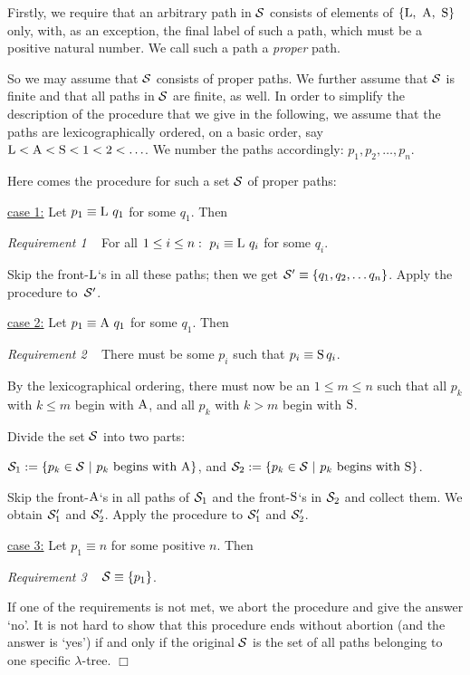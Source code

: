 \documentclass[submission,copyright,creativecommons]{eptcs}
\begin{document}
\begin{Proc}\label{ProLamTre}
Firstly, we require that an arbitrary path in ${\cal S}$ consists of elements of $\{ {\rm L}, ~ {\rm A}, ~ {\rm S} \}$ only, with, as an exception, the final label of such a path, which must be a positive natural number. We call such a path a {\em proper\/} path.

So we may assume that ${\cal S}$ consists of proper paths. We further assume that ${\cal S}$ is finite and that all paths in ${\cal S}$ are finite, as well. In order to simplify the description of the procedure that we give in the following, we assume that the paths are lexicographically ordered, on a basic order, say ${\rm L} < {\rm A} < {\rm S} < 1 < 2 < \ldots$. We number the paths accordingly: $p_1, p_2, \ldots, p_n$.

Here comes the procedure for such a set ${\cal S}$ of proper paths:

\underline{case 1:} Let $p_1 \equiv {\rm L} ~ q_1$ for some $q_1$. Then

{\em Requirement 1\/} ~ For all $1 \leq i \leq n:
~p_i \equiv {\rm L} ~ q_i$ for some $q_i$.

Skip the front-${\rm L}$`s in all these paths; then we get ${\cal S}' \equiv \{q_1, q_2, \ldots q_n \}$. Apply the procedure to~${\cal S}'$.


\underline{case 2:} Let $p_1 \equiv {\rm A} ~ q_1$ for some $q_1$. Then

{\em Requirement 2\/} ~ There must be some $p_i$ such that $p_i \equiv {\rm S} \, q_i$.

By the lexicographical ordering, there must now be an $1 \leq m \leq n$ such that all $p_k$ with $k \leq m$ begin with ${\rm A}$, and all $p_k$ with $k > m$ begin with ${\rm S}$.

Divide the set ${\cal S}$ into two parts:

${\cal S}_1 := \{ p_k \in {\cal S} ~|~ p_k {\rm ~begins~with~} {\rm A} \}$, and ${\cal S}_2 := \{ p_k \in {\cal S} ~|~ p_k {\rm ~begins~with~} {\rm S} \}$.

Skip the front-${\rm A}$`s in all paths of ${\cal S}_1$ and the front-${\rm S}$`s in ${\cal S}_2$ and collect them. We obtain ${\cal S}'_1$ and ${\cal S}'_2$. Apply the procedure to ${\cal S}'_1$ and ${\cal S}'_2$.


\underline{case 3:} Let $p_1 \equiv n$ for some positive $n$. Then

{\em Requirement 3\/} ~ ${\cal S} \equiv \{ p_1 \}$.

\smallskip

If one of the requirements is not met, we abort the procedure and give the answer `no'. It is not hard to show that this procedure ends without abortion (and the answer is `yes') if and only if the original ${\cal S}$ is the set of all paths belonging to one specific $\lambda$-tree. $\Box$

\end{Proc}
\end{document}
